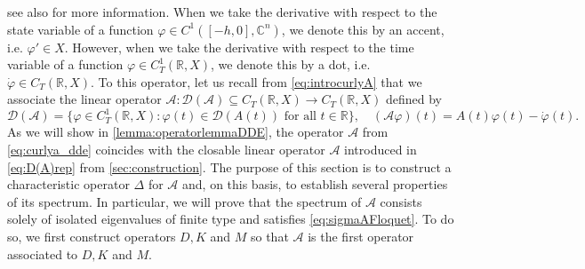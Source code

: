 \documentclass[english]{myarticle}
\begin{document}
\begin{sloppypar}
\begin{equation*}
\end{equation*}
see also \cite{Article2,Clement1988} for more information. When we take the derivative with respect to the state variable of a function $\varphi \in C^1([-h,0],\mathbb{C}^n)$, we denote this by an accent, i.e. $\varphi' \in X$. However, when we take the derivative with respect to the time variable of a function $\varphi \in C_T^1(\mathbb{R},X)$, we denote this by a dot, i.e. $\dot{\varphi} \in C_T(\mathbb{R},X)$. To this operator, let us recall from \eqref{eq:introcurlyA} that we associate the linear operator $\mathcal{A} : \mathcal{D}(\mathcal{A}) \subseteq C_T(\mathbb{R},X) \to C_T(\mathbb{R},X)$ defined by 
\begin{equation} \label{eq:curlya_dde}
     \mathcal{D}(\mathcal{A}) = \{ \varphi \in C_T^1(\mathbb{R},X) : \varphi(t) \in \mathcal{D}(A(t)) \mbox{ for all $t \in \mathbb{R}$} \}, \quad (\mathcal{A}\varphi)(t) = A(t)\varphi(t) - \dot{\varphi}(t). 
\end{equation}
As we will show in \cref{lemma:operatorlemmaDDE}, the operator $\mathcal{A}$ from \eqref{eq:curlya_dde} coincides with the closable linear operator $\mathcal{A}$ introduced in \eqref{eq:D(A)rep} from \cref{sec:construction}. The purpose of this section is to construct a characteristic operator $\Delta$ for $\mathcal{A}$ and, on this basis, to establish several properties of its spectrum. In particular, we will prove that the spectrum of $\mathcal{A}$ consists solely of isolated eigenvalues of finite type and satisfies \eqref{eq:sigmaAFloquet}. To do so, we first construct operators $D, K$ and $M$ so that $\mathcal{A}$ is the first operator associated to $D, K$ and $M$.


\end{sloppypar}
\end{document}
